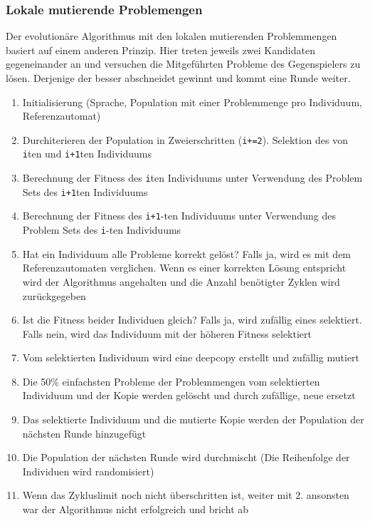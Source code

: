 \subsubsection{Lokale mutierende Problemengen}
\label{subsec:LocalEvolvingProblemSet}
Der evolutionäre Algorithmus mit den lokalen mutierenden Problemmengen basiert auf einem anderen Prinzip. Hier treten jeweils zwei Kandidaten gegeneinander an und versuchen die Mitgeführten Probleme des Gegenspielers zu lösen. Derjenige der besser abschneidet gewinnt und kommt eine Runde weiter.

\begin{enumerate}
\item Initialisierung (Sprache, Population mit einer Problemmenge pro Individuum, Referenzautomat)
\item Durchiterieren der Population in Zweierschritten (\lstinline$i+=2$). Selektion des von \lstinline$i$ten und \lstinline$i+1$ten Individuums
\item Berechnung der Fitness des \lstinline$i$ten Individuums unter Verwendung des Problem Sets des \lstinline$i+1$ten Individuums
\item Berechnung der Fitness des \lstinline$i+1$-ten Individuums unter Verwendung des Problem Sets des \lstinline$i$-ten Individuums
\item Hat ein Individuum alle Probleme korrekt gelöst? Falls ja, wird es mit dem Referenzautomaten verglichen. Wenn es einer korrekten Lösung entspricht wird der Algorithmus angehalten und die Anzahl benötigter Zyklen wird zurückgegeben
\item Ist die Fitness beider Individuen gleich? Falls ja, wird zufällig eines selektiert. Falls nein, wird das Individuum mit der höheren Fitness selektiert
\item Vom selektierten Individuum wird eine \Gls{deepcopy} erstellt und zufällig mutiert
\item Die 50\% einfachsten Probleme der Problemmengen vom selektierten Individuum und der Kopie werden gelöscht und durch zufällige, neue ersetzt 
\item Das selektierte Individuum und die mutierte Kopie werden der Population der nächsten Runde hinzugefügt
\item Die Population der nächsten Runde wird durchmischt (Die Reihenfolge der Individuen wird randomisiert)
\item Wenn das Zykluslimit noch nicht überschritten ist, weiter mit 2. ansonsten war der Algorithmus nicht erfolgreich und bricht ab
\end{enumerate}